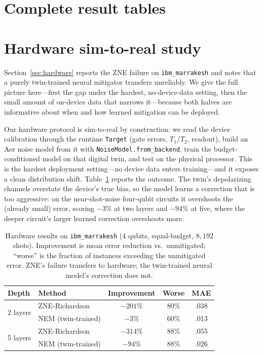\documentclass[11pt]{article}
\begin{document}



\appendix

\section{Complete result tables}
\label{app:tables}






\section{Hardware sim-to-real study}
\label{app:hardware}

Section~\ref{sec:hardware} reports the ZNE failure on \texttt{ibm\_marrakesh} and notes that a purely twin-trained neural mitigator transfers unreliably. We give the full picture here---first the gap under the hardest, no-device-data setting, then the small amount of on-device data that narrows it---because both halves are informative about when and how learned mitigation can be deployed.

Our hardware protocol is sim-to-real by construction: we read the device calibration through the runtime \texttt{Target} (gate errors, $T_1/T_2$, readout), build an Aer noise model from it with \texttt{NoiseModel.from\_backend}, train the budget-conditioned model on that digital twin, and test on the physical processor. This is the hardest deployment setting---no device data enters training---and it exposes a clean distribution shift. Table~\ref{tab:hardware} reports the outcome. The twin's depolarizing channels overstate the device's true bias, so the model learns a correction that is too aggressive: on the near-shot-noise four-qubit circuits it overshoots the (already small) error, scoring $-3\%$ at two layers and $-94\%$ at five, where the deeper circuit's larger learned correction overshoots more.

\begin{table}[t]
\caption{Hardware results on \texttt{ibm\_marrakesh} (4 qubits, equal-budget, $8{,}192$ shots). Improvement is mean error reduction vs.\ unmitigated; ``worse'' is the fraction of instances exceeding the unmitigated error. ZNE's failure transfers to hardware; the twin-trained neural model's correction does not.}
\label{tab:hardware}
\centering
\small
\begin{tabular}{llccc}
\toprule
Depth & Method & Improvement & Worse & MAE \\
\midrule
\multirow{2}{*}{2 layers} & ZNE-Richardson & $-201\%$ & 80\% & .038 \\
 & NEM (twin-trained) & $-3\%$ & 60\% & .013 \\
\midrule
\multirow{2}{*}{5 layers} & ZNE-Richardson & $-314\%$ & 88\% & .055 \\
 & NEM (twin-trained) & $-94\%$ & 88\% & .026 \\
\bottomrule
\end{tabular}
\end{table}
\end{document}
